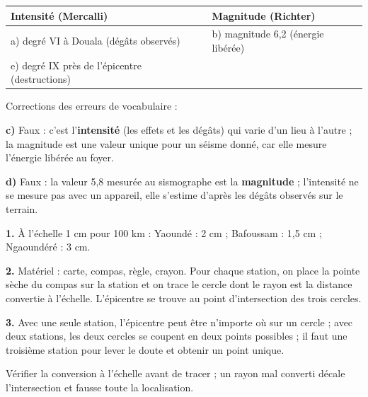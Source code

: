\documentclass[11pt]{article}
\begin{document}
\begin{corrige}
\begin{center}
\begin{tabularx}{\linewidth}{|X|X|}
\hline
\rowcolor{popblueL} Intensité (Mercalli) & Magnitude (Richter) \\
\hline
a) degré VI à Douala (dégâts observés) & b) magnitude 6,2 (énergie libérée) \\
\hline
e) degré IX près de l'épicentre (destructions) & \\
\hline
\end{tabularx}
\end{center}

Corrections des erreurs de vocabulaire :

\textbf{c)} Faux : c'est l'\textbf{intensité} (les effets et les dégâts) qui varie d'un lieu à l'autre ; la magnitude est une valeur unique pour un séisme donné, car elle mesure l'énergie libérée au foyer.

\textbf{d)} Faux : la valeur 5,8 mesurée au sismographe est la \textbf{magnitude} ; l'intensité ne se mesure pas avec un appareil, elle s'estime d'après les dégâts observés sur le terrain.
\end{corrige}

\begin{corrige}
\textbf{1.} À l'échelle 1 cm pour 100 km : Yaoundé : 2 cm ; Bafoussam : 1,5 cm ; Ngaoundéré : 3 cm.

\textbf{2.} Matériel : carte, compas, règle, crayon. Pour chaque station, on place la pointe sèche du compas sur la station et on trace le cercle dont le rayon est la distance convertie à l'échelle. L'épicentre se trouve au point d'intersection des trois cercles.

\textbf{3.} Avec une seule station, l'épicentre peut être n'importe où sur un cercle ; avec deux stations, les deux cercles se coupent en deux points possibles ; il faut une troisième station pour lever le doute et obtenir un point unique.

\begin{attention}
Vérifier la conversion à l'échelle avant de tracer ; un rayon mal converti décale l'intersection et fausse toute la localisation.
\end{attention}
\end{corrige}
\end{document}
